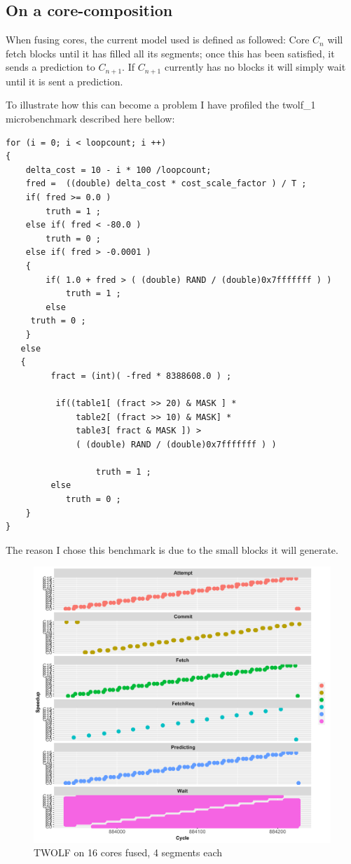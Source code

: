 \subsection{On a core-composition}

When fusing cores, the current model used is defined as followed: Core $C_n$ will fetch blocks until it has filled all its segments; once this has been satisfied, it sends a prediction to $C_{n+1}$.
If $C_{n+1}$ currently has no blocks it will simply wait until it is sent a prediction.

To illustrate how this can become a problem I have profiled the twolf\_1 microbenchmark described here bellow:
\begin{lstlisting}
for (i = 0; i < loopcount; i ++)
{
    delta_cost = 10 - i * 100 /loopcount;
    fred =  ((double) delta_cost * cost_scale_factor ) / T ; 
    if( fred >= 0.0 ) 
        truth = 1 ;
    else if( fred < -80.0 )  
        truth = 0 ;
    else if( fred > -0.0001 ) 
    {
        if( 1.0 + fred > ( (double) RAND / (double)0x7fffffff ) )  
            truth = 1 ;
        else 
	 truth = 0 ;
    }
   else 
   {
         fract = (int)( -fred * 8388608.0 ) ;

          if((table1[ (fract >> 20) & MASK ] * 
              table2[ (fract >> 10) & MASK] * 
              table3[ fract & MASK ]) > 
              ( (double) RAND / (double)0x7fffffff ) ) 

                  truth = 1 ;
         else 
            truth = 0 ;
    }
}
\end{lstlisting}

The reason I chose this benchmark is due to the small blocks it will generate.

\begin{figure}
\center
  \includegraphics[width=1\textwidth]{chapter3/graphics/twolf_16.pdf}
  \caption{TWOLF on 16 cores fused, 4 segments each}\label{fig:16step}
\end{figure}

